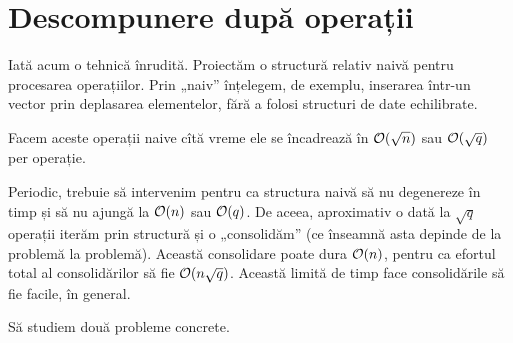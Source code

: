 \documentclass[../main.tex]{subfiles}
\begin{document}
\section{Descompunere după operații}

Iată acum o tehnică înrudită. Proiectăm o structură relativ naivă pentru procesarea operațiilor. Prin „naiv” înțelegem, de exemplu, inserarea într-un vector prin deplasarea elementelor, fără a folosi structuri de date echilibrate.

Facem aceste operații naive cîtă vreme ele se încadrează în $\mathcal{O}(\sqrt{n})$ sau $\mathcal{O}(\sqrt{q})$ per operație.

Periodic, trebuie să intervenim pentru ca structura naivă să nu degenereze în timp și să nu ajungă la $\mathcal{O}(n)$ sau $\mathcal{O}(q)$. De aceea, aproximativ o dată la $\sqrt{q}$ operații iterăm prin structură și o „consolidăm” (ce înseamnă asta depinde de la problemă la problemă). Această consolidare poate dura $\mathcal{O}(n)$, pentru ca efortul total al consolidărilor să fie $\mathcal{O}(n \sqrt{q})$. Această limită de timp face consolidările să fie facile, în general.

Să studiem două probleme concrete.
\end{document}
